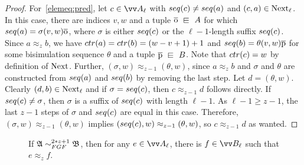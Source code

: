 \begin{proof}
  For~\ref{elemeq:pred}, let $c \in \unraveldom{A}_{\ell}$ with $\seq{c} \neq \seq{a}$ and $(c,a) \in \mathrm{Next}_{\ell}$.
  In this case, there are indices $v,w$ and a tuple $\elemtupleo \sqin A$ for which $\seq{a} = \sigma (v,w) \elemtupleo$, where $\sigma$ is either $\seq{c}$ or the $\ell-1$-length suffix $\seq{c}$.
  Since $a \approx_{z} b$, we have $\ctr{a} = \ctr{b} = (w-v+1) + 1$ and $\seq{b} = \theta (v,w) \elemtuplep$ for some bisimulation sequence $\theta$ and a tuple $\elemtuplep \sqin B$.
  Note that $\ctr{c} = w$ by definition of $\mathrm{Next}$.
  Further, $(\sigma, w) \approx_{z-1} (\theta, w)$, since $a \approx_{z} b$ and $\sigma$ and $\theta$ are constructed from $\seq{a}$ and $\seq{b}$ by removing the last step.
  Let $d = (\theta, w)$.
  Clearly $(d,b) \in \mathrm{Next}_{\ell}$ and if $\sigma = \seq{c}$, then $c \approx_{z-1} d$ follows directly.
  If $\seq{c} \neq \sigma$, then $\sigma$ is a suffix of $\seq{c}$ with length $\ell-1$.
  As $\ell-1 \ge z-1$, the last $z-1$ steps of $\sigma$ and $\seq{c}$ are equal in this case.
  Therefore, $(\sigma, w) \approx_{z-1} (\theta, w)$ implies $(\seq{c}, w) \approx_{z-1} (\theta, w)$, so $c \approx_{z-1} d$ as wanted.
  \end{proof}
\begin{description}
  \item[] If $\str{A} \bisimto_{\FGF}^{2*z + 1} \str{B}$, then for any $e \in \unraveldom{A}_{\ell}$, there is $f \in \unraveldom{B}_{\ell}$ such that $e \approx_{z} f$.
\end{description}


